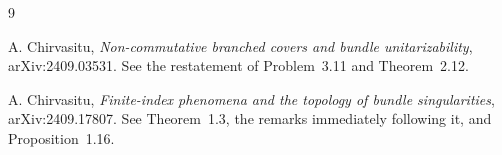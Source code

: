 \documentclass[11pt]{article}
\begin{document}
\enlargethispage{3\baselineskip}
\begin{thebibliography}{9}
\raggedright
{}
A. Chirvasitu,
\emph{Non-commutative branched covers and bundle unitarizability},
arXiv:2409.03531.  See the restatement of Problem~3.11 and Theorem~2.12.

A. Chirvasitu,
\emph{Finite-index phenomena and the topology of bundle singularities},
arXiv:2409.17807.  See Theorem~1.3, the remarks immediately following it,
and Proposition~1.16.
\end{thebibliography}
\end{document}
